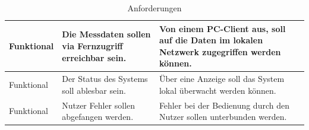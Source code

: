 \begin{table}[H]
\begin{center}
\begin{tabularx}{\textwidth}{|p{3cm}|X|X|X|}
Funktional & Die Messdaten sollen via Fernzugriff erreichbar sein. & Von einem PC-Client aus, soll auf die Daten im lokalen Netzwerk zugegriffen werden können.\\ \hline
Funktional & Der Status des Systems soll ablesbar sein. & Über eine Anzeige soll das System lokal überwacht werden können.\\ \hline
Funktional & Nutzer Fehler sollen abgefangen werden. & Fehler bei der Bedienung durch den Nutzer sollen unterbunden werden.\\ \hline
\end{tabularx}
\caption{Anforderungen}
\label{table_Anforderungen}
\end{center}
\end{table}













